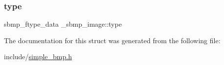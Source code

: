 \mbox{\label{struct__sbmp__image_a3ebf318f03ec1097bbde248b2d9ab769}} 
\subsubsection{\texorpdfstring{type}{type}}
{\footnotesize\ttfamily sbmp\+\_\+ftype\+\_\+data \+\_\+sbmp\+\_\+image\+::type}



The documentation for this struct was generated from the following file\+:\begin{DoxyCompactItemize}
\item 
include/\hyperlink{simple__bmp_8h}{simple\+\_\+bmp.\+h}\end{DoxyCompactItemize}
